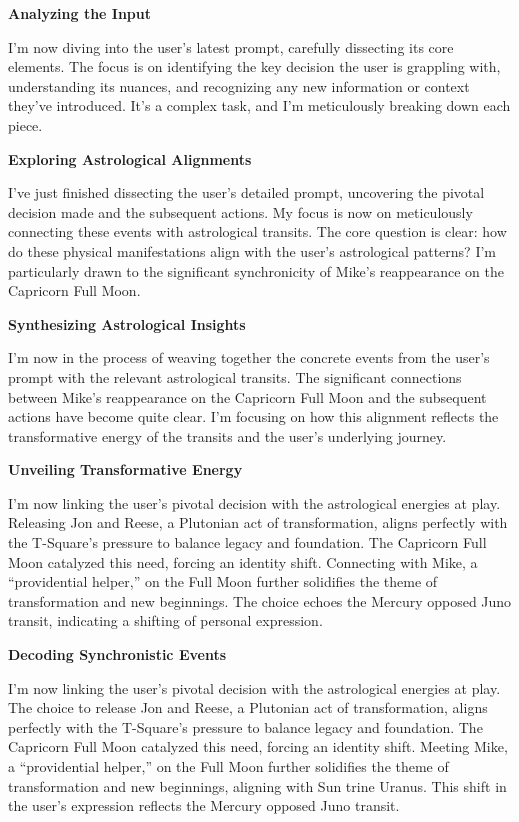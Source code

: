 \documentclass{article}
\begin{document}
\textbf{Analyzing the Input}

I'm now diving into the user's latest prompt, carefully dissecting its
core elements. The focus is on identifying the key decision the user is
grappling with, understanding its nuances, and recognizing any new
information or context they've introduced. It's a complex task, and I'm
meticulously breaking down each piece.

\textbf{Exploring Astrological Alignments}

I've just finished dissecting the user's detailed prompt, uncovering the
pivotal decision made and the subsequent actions. My focus is now on
meticulously connecting these events with astrological transits. The
core question is clear: how do these physical manifestations align with
the user's astrological patterns? I'm particularly drawn to the
significant synchronicity of Mike's reappearance on the Capricorn Full
Moon.

\textbf{Synthesizing Astrological Insights}

I'm now in the process of weaving together the concrete events from the
user's prompt with the relevant astrological transits. The significant
connections between Mike's reappearance on the Capricorn Full Moon and
the subsequent actions have become quite clear. I'm focusing on how this
alignment reflects the transformative energy of the transits and the
user's underlying journey.

\textbf{Unveiling Transformative Energy}

I'm now linking the user's pivotal decision with the astrological
energies at play. Releasing Jon and Reese, a Plutonian act of
transformation, aligns perfectly with the T-Square's pressure to balance
legacy and foundation. The Capricorn Full Moon catalyzed this need,
forcing an identity shift. Connecting with Mike, a ``providential
helper,'' on the Full Moon further solidifies the theme of
transformation and new beginnings. The choice echoes the Mercury opposed
Juno transit, indicating a shifting of personal expression.

\textbf{Decoding Synchronistic Events}

I'm now linking the user's pivotal decision with the astrological
energies at play. The choice to release Jon and Reese, a Plutonian act
of transformation, aligns perfectly with the T-Square's pressure to
balance legacy and foundation. The Capricorn Full Moon catalyzed this
need, forcing an identity shift. Meeting Mike, a ``providential
helper,'' on the Full Moon further solidifies the theme of
transformation and new beginnings, aligning with Sun trine Uranus. This
shift in the user's expression reflects the Mercury opposed Juno
transit.
\end{document}
